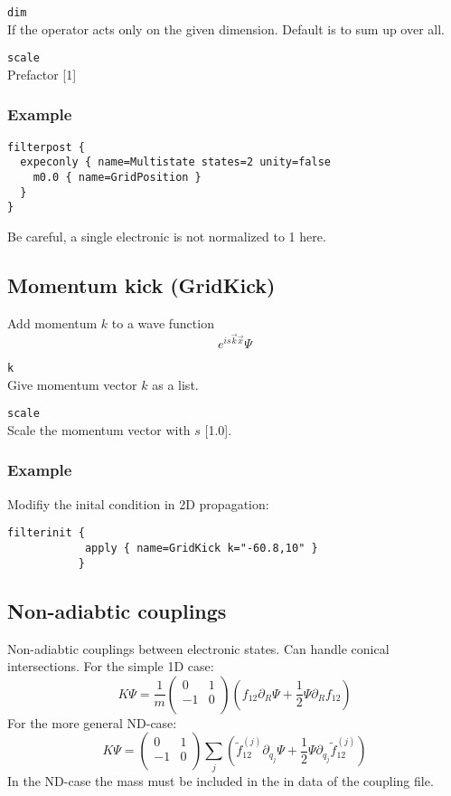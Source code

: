 \documentclass[a4paper,12pt]{scrbook}
\newcommand{\option}[2]{\item \texttt{#1}\\ #2}
\begin{document}
\begin{options}
 \option{dim}{If the operator acts only on the given dimension. Default is to sum up over all.}
  \option{scale}{Prefactor [1]}
\end{options}

\subsubsection*{Example}
\begin{verbatim}
filterpost {
  expeconly { name=Multistate states=2 unity=false
    m0.0 { name=GridPosition }
  }
}
\end{verbatim}
Be careful, a single electronic is not normalized to 1 here.

\subsection{Momentum kick (GridKick)}
Add momentum $k$ to a wave function
\begin{equation}
 e^{i s \vec{k} \vec{x}} \Psi
\end{equation}
\begin{options}
 \option{k}{Give momentum vector $k$ as a list.}
 \option{scale}{Scale the momentum vector with $s$ [1.0].}
\end{options}

\subsubsection*{Example}
Modifiy the inital condition in 2D propagation:
\begin{verbatim}
filterinit {
            apply { name=GridKick k="-60.8,10" }
           }
\end{verbatim}


\subsection{Non-adiabtic couplings}
Non-adiabtic couplings between electronic states. Can handle conical intersections.
For the simple 1D case:
\begin{equation}
 K \Psi = \frac{1}{m}
\begin{pmatrix}
 0 & 1 \\
-1 & 0 \\
\end{pmatrix}
\left (
f_{12} \partial_R \Psi + \dfrac{1}{2} \Psi \partial_R f_{12}
\right )
\end{equation}
For the more general ND-case:
\begin{equation}
 K \Psi =
\begin{pmatrix}
 0 & 1 \\
-1 & 0 \\
\end{pmatrix}
\sum_j \left (
\tilde f_{12}^{(j)} \partial_{q_j} \Psi + \dfrac{1}{2} \Psi \partial_{q_j} \tilde f_{12}^{(j)}
\right )
\end{equation}
In the ND-case the mass must be included in the in data of the coupling file.
\end{document}
